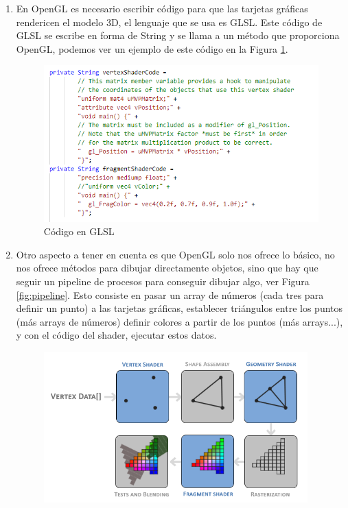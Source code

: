 \begin{enumerate}
    
    \item En OpenGL es necesario escribir código para que las tarjetas gráficas rendericen el modelo 3D,
    el lenguaje que se usa es GLSL. Este código de GLSL se escribe en forma de String y se llama a un método 
    que proporciona OpenGL, podemos ver un ejemplo de este código en la Figura \ref{fig:codigoGLSL}.
    \begin{figure}[H]
        \centering
        \includegraphics[width=5in]{figures/GLSL.png}
        \caption{Código en GLSL}
        \label{fig:codigoGLSL}
    \end{figure}
    \newpage    
    \item Otro aspecto a tener en cuenta es que OpenGL solo nos ofrece lo básico, no nos ofrece métodos para dibujar 
    directamente objetos, sino que hay que seguir un pipeline de procesos para conseguir dibujar algo, ver Figura \ref{fig:pipeline}.
    Esto consiste en pasar un array de números (cada tres para definir un punto) 
    a las tarjetas gráficas, establecer triángulos entre los puntos (más arrays de números) 
    definir colores a partir de los puntos (más arrays...), y con el código del shader, ejecutar 
    estos datos.
    \begin{figure}
        \centering
        \includegraphics[width=4in]{figures/pipeline.png}

\end{figure}
\end{enumerate}
